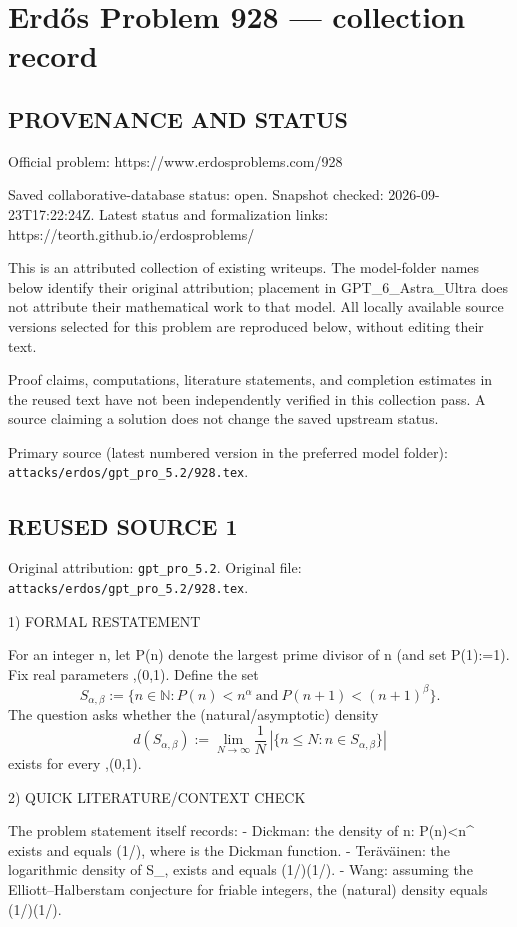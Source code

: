 \section*{Erd\H{o}s Problem 928 --- collection record}

\subsection*{PROVENANCE AND STATUS}
Official problem: https://www.erdosproblems.com/928

Saved collaborative-database status: open.
Snapshot checked: 2026-09-23T17:22:24Z.
Latest status and formalization links: https://teorth.github.io/erdosproblems/

This is an attributed collection of existing writeups. The model-folder names below identify their original attribution; placement in GPT\_6\_Astra\_Ultra does not attribute their mathematical work to that model. All locally available source versions selected for this problem are reproduced below, without editing their text.

Proof claims, computations, literature statements, and completion estimates in the reused text have not been independently verified in this collection pass. A source claiming a solution does not change the saved upstream status.

Primary source (latest numbered version in the preferred model folder): \texttt{attacks/erdos/gpt\_pro\_5.2/928.tex}.

\subsection*{REUSED SOURCE 1}
Original attribution: \texttt{gpt\_pro\_5.2}.
Original file: \texttt{attacks/erdos/gpt\_pro\_5.2/928.tex}.


1) FORMAL RESTATEMENT

For an integer n, let P(n) denote the largest prime divisor of n (and set P(1):=1).
Fix real parameters \alpha,\beta\in(0,1).
Define the set
\[ S_{\alpha,\beta} := \{n\in\mathbb N: P(n) < n^{\alpha}\ \text{and}\ P(n+1) < (n+1)^{\beta}\}. \]
The question asks whether the (natural/asymptotic) density
\[ d(S_{\alpha,\beta}) := \lim_{N\to\infty} \frac{1}{N}\, |\{n\le N: n\in S_{\alpha,\beta}\}| \]
exists for every \alpha,\beta\in(0,1).


2) QUICK LITERATURE/CONTEXT CHECK

The problem statement itself records:
- Dickman: the density of {n: P(n)<n^\alpha} exists and equals \rho(1/\alpha), where \rho is the Dickman function.
- Ter\"{a}v\"{a}inen: the logarithmic density of S_{\alpha,\beta} exists and equals \rho(1/\alpha)\rho(1/\beta).
- Wang: assuming the Elliott–Halberstam conjecture for friable integers, the (natural) density equals \rho(1/\alpha)\rho(1/\beta).

